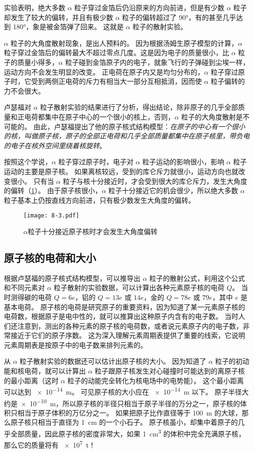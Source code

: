 实验表明，绝大多数 $\alpha$ 粒子穿过金箔后仍沿原来的方向前进，但是有少数 $\alpha$ 粒子却发生了较大的偏转，并且有极少数 $\alpha$ 粒子的偏转超过了 \ang{90}，有的甚至几乎达到 \ang{180}，象是被金箔弹了回来。
这就是 $\alpha$ 粒子的散射实验。

$\alpha$ 粒子的大角度散射现象，是出人预料的。
因为根据汤姆生原子模型的计算，$\alpha$ 粒子穿过金箔后的偏转最大不超过零点几度。这是因为电子的质量很小，比 $\alpha$ 粒子的质量小得多，$\alpha$ 粒子碰到金箔原子内的电子，就象飞行的子弹碰到尘埃一样，运动方向不会发生明显的改变。
正电荷在原子内又是均匀分布的，$\alpha$ 粒子穿过原子时，它受到两侧正电荷的斥力有相当大一部分互相抵消，因而使 $\alpha$ 粒子偏转的力不会很大。

卢瑟福对 $\alpha$ 粒子散射实验的结果进行了分析，得出结论，除非原子的几乎全部质量和正电荷都集中在原子中心的一个很小的核上，否则，$\alpha$ 粒子的大角度散射是不可能的。
由此，卢瑟福提出了他的原子核式结构模型：\emph{在原子的中心有一个很小的核，叫做原子核，原子的全部正电荷和几乎全部质量都集中在原子核里，带负电的电子在核外空间里绕着核旋转}。

按照这个学说，$\alpha$ 粒子穿过原子时，电子对 $\alpha$ 粒子运动的影响很小，影响 $\alpha$ 粒子运动的主要是原子核。
如果离核较远，受到的库仑斥力就很小，运动方向也就改变很小。
只有当 $\alpha$ 粒子与核十分接近时，才会受到很大的库仑斥力，发生大角度的偏转（\cref{fig:8-3}）。
由于原子核很小，$\alpha$ 粒子十分接近它的机会很少，所以绝大多数 $\alpha$ 粒子基本上仍按直线方向前进，只有极少数发生大角度的偏转。
\begin{figure}
  \texttt{[image: 8-3.pdf]}
  \caption{$\alpha$粒子十分接近原子核时才会发生大角度偏转}\label{fig:8-3}
\end{figure}

\subsection{原子核的电荷和大小} 
根据卢瑟福的原子核式结构模型，可以推导出 $\alpha$ 粒子的散射公式，利用这个公式和不同元素对 $\alpha$ 粒子散射的实验数据，可以计算出各种元素原子核的电荷 $Q$。
当时测得碳的电荷 $Q=6e$，铝的 $Q=13e$ 或 $14e$，金的 $Q=78e$ 或 $79e$，其中 $e$ 是基本电荷。
原子核的电荷是研究原子的重要资料，因为知道了某一元素原子核的电荷数，根据原子是电中性的，就可以推算出这种原子内含有的电子数。
当时人们还注意到，测出的各种元素的原子核的电荷数，或者说元素原子内的电子数，非常接近于它们的原子序数。
这为深入理解元素周期表提供了重要的线索，它说明元素周期表是按原子中的电子数来排列元素的。

从 $\alpha$ 粒子散射实验的数据还可以估计出原子核的大小。
因为知道了 $\alpha$ 粒子的初动能和核电荷，就可以计算出 $\alpha$ 粒子跟原子核发生对心碰撞时可能达到的离原子核的最小距离（这时 $\alpha$ 粒子的动能完全转化为核电场中的电势能）。
这个最小距离可以达到 \qty{e-14}{m}。
可见原子核的大小应在 \qty{e-14}{m} 以下。
原子半径大约是\qty{e-10}{m}，所以原子核的半径只相当于原子半径的万分之一，原子核的体积只相当于原子体积的万亿分之一。
如果把原子比作直径等于 \qty{100}{m} 的大球，那么原子核只相当于直径为 \qty{1}{cm} 的一个小石子。
原子核虽小，却集中着原子的几乎全部质量，因此原子核的密度非常大，如果 \qty{1}{cm^3} 的体积中完全充满原子核，那么它的质量将有 \qty{e7}{t}！

